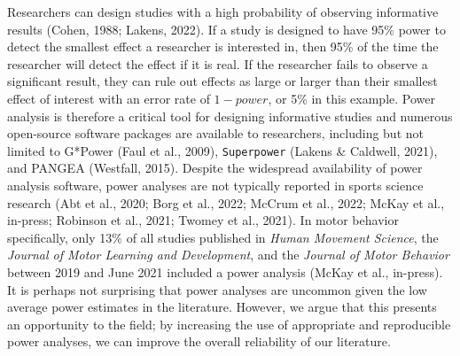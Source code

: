 \documentclass[
  man, donotrepeattitle,mask,floatsintext]{apa7}
\begin{document}
Researchers can design studies with a high probability of observing informative results (Cohen, 1988; Lakens, 2022). If a study is designed to have 95\% power to detect the smallest effect a researcher is interested in, then 95\% of the time the researcher will detect the effect if it is real. If the researcher fails to observe a significant result, they can rule out effects as large or larger than their smallest effect of interest with an error rate of \(1 - power\), or 5\% in this example. Power analysis is therefore a critical tool for designing informative studies and numerous open-source software packages are available to researchers, including but not limited to G*Power (Faul et al., 2009), \texttt{Superpower} (Lakens \& Caldwell, 2021), and PANGEA (Westfall, 2015). Despite the widespread availability of power analysis software, power analyses are not typically reported in sports science research (Abt et al., 2020; Borg et al., 2022; McCrum et al., 2022; McKay et al., in-press; Robinson et al., 2021; Twomey et al., 2021). In motor behavior specifically, only 13\% of all studies published in \emph{Human Movement Science}, the \emph{Journal of Motor Learning and Development}, and the \emph{Journal of Motor Behavior} between 2019 and June 2021 included a power analysis (McKay et al., in-press). It is perhaps not surprising that power analyses are uncommon given the low average power estimates in the literature. However, we argue that this presents an opportunity to the field; by increasing the use of appropriate and reproducible power analyses, we can improve the overall reliability of our literature.
\end{document}
